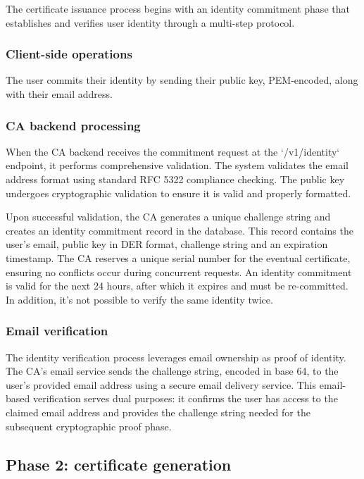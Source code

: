 The certificate issuance process begins with an identity commitment phase that 
establishes and verifies user identity through a multi-step protocol.

\subsubsection{Client-side operations}

The user commits their identity by sending their public key, PEM-encoded,
along with their email address.

\subsubsection{CA backend processing}

When the CA backend receives the commitment request at the `/v1/identity` 
endpoint, it performs comprehensive validation.
The system validates the email address format using standard RFC 5322 compliance 
checking. The public key undergoes cryptographic validation 
to ensure it is valid and properly formatted.

Upon successful validation, the CA generates a unique challenge string and creates 
an identity commitment record in the database. This record contains the user's 
email, public key in DER format, challenge string and an 
expiration timestamp. The CA reserves a unique serial number for the eventual 
certificate, ensuring no conflicts occur during concurrent requests. An identity
commitment is valid for the next 24 hours, after which it expires and must be 
re-committed. In addition, it's not possible to verify the same identity twice.

\subsubsection{Email verification}

The identity verification process leverages email ownership as proof of identity. 
The CA's email service sends the challenge string, encoded in base 64, to the user's provided email 
address using a secure email delivery service.
This email-based verification serves dual purposes: it confirms the user has 
access to the claimed email address and provides the challenge string needed 
for the subsequent cryptographic proof phase.

\subsection{Phase 2: certificate generation}


